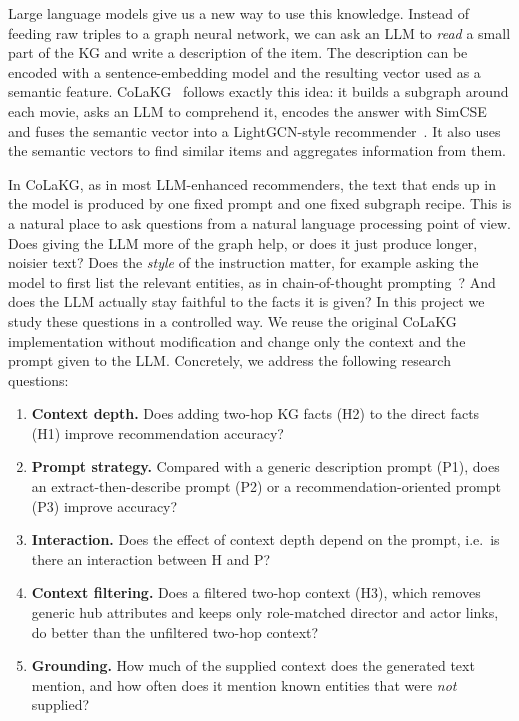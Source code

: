 \documentclass[a4paper,11pt]{article}
\begin{document}
Large language models give us a new way to use this knowledge. Instead of feeding raw triples to a graph neural network, we can ask an LLM to \emph{read} a small part of the KG and write a description of the item. The description can be encoded with a sentence-embedding model and the resulting vector used as a semantic feature. CoLaKG~\cite{cui2025colakg} follows exactly this idea: it builds a subgraph around each movie, asks an LLM to comprehend it, encodes the answer with SimCSE~\cite{gao2021simcse} and fuses the semantic vector into a LightGCN-style recommender~\cite{he2020lightgcn}. It also uses the semantic vectors to find similar items and aggregates information from them.

In CoLaKG, as in most LLM-enhanced recommenders, the text that ends up in the model is produced by one fixed prompt and one fixed subgraph recipe. This is a natural place to ask questions from a natural language processing point of view. Does giving the LLM more of the graph help, or does it just produce longer, noisier text? Does the \emph{style} of the instruction matter, for example asking the model to first list the relevant entities, as in chain-of-thought prompting~\cite{wei2022cot}? And does the LLM actually stay faithful to the facts it is given? In this project we study these questions in a controlled way. We reuse the original CoLaKG implementation without modification and change only the context and the prompt given to the LLM. Concretely, we address the following research questions:
\begin{enumerate}[label=\textbf{RQ\arabic*}, leftmargin=3em]
    \item \textbf{Context depth.} Does adding two-hop KG facts (H2) to the direct facts (H1) improve recommendation accuracy?
    \item \textbf{Prompt strategy.} Compared with a generic description prompt (P1), does an extract-then-describe prompt (P2) or a recommendation-oriented prompt (P3) improve accuracy?
    \item \textbf{Interaction.} Does the effect of context depth depend on the prompt, i.e.\ is there an interaction between H and P?
    \item \textbf{Context filtering.} Does a filtered two-hop context (H3), which removes generic hub attributes and keeps only role-matched director and actor links, do better than the unfiltered two-hop context?
    \item \textbf{Grounding.} How much of the supplied context does the generated text mention, and how often does it mention known entities that were \emph{not} supplied?
\end{enumerate}
\end{document}
